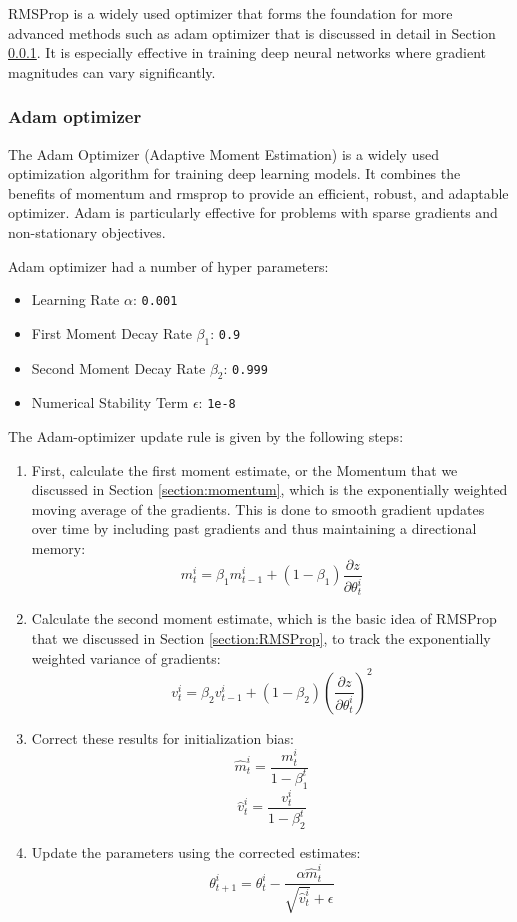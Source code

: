 		
		RMSProp is a widely used optimizer that forms the foundation for more advanced methods such as adam optimizer that is discussed in detail in Section \ref{section:adam}. It is especially effective in training deep neural networks where gradient magnitudes can vary significantly.

	
		\bigskip
		\subsubsection{Adam optimizer}
		\label{section:adam}
		
		The Adam Optimizer (Adaptive Moment Estimation) is a widely used optimization algorithm for training deep learning models. It combines the benefits of momentum and rmsprop to provide an efficient, robust, and adaptable optimizer. Adam is particularly effective for problems with sparse gradients and non-stationary objectives.
		
		
		Adam optimizer had a number of hyper parameters:
		
		\begin{itemize}
			\item Learning Rate $\alpha$: \texttt{0.001}
			\item First Moment Decay Rate $\beta_1$: \texttt{0.9}
			\item Second Moment Decay Rate $\beta_2$: \texttt{0.999}
			\item Numerical Stability Term $\epsilon$: \texttt{1e-8}
		\end{itemize}
		\bigskip

		
		The Adam-optimizer update rule is given by the following steps:
		\bigskip
		\begin{enumerate}
			\item First, calculate the first moment estimate, or the Momentum that we discussed in Section \ref{section:momentum}, which is the exponentially weighted moving average of the gradients. This is done to smooth gradient updates over time by including past gradients and thus maintaining a directional memory:
			$$
			m^i_t = \beta_1 m^i_{t-1} + (1 - \beta_1)\frac{\partial z}{\partial \theta^i_{t}}
			$$
			
			\item Calculate the second moment estimate, which is the basic idea of RMSProp that we discussed in Section \ref{section:RMSProp}, to track the exponentially weighted variance of gradients:
			$$
			v^i_t = \beta_2 v^i_{t-1} + (1 - \beta_2) \left( \frac{\partial z}{\partial \theta^i_{t}} \right)^2
			$$
			
			\item Correct these results for initialization bias:
			$$
			\hat{m}^i_t = \frac{m^i_t}{1 - \beta_1^t}
			$$
			$$
			\hat{v}^i_t = \frac{v^i_t}{1 - \beta_2^t}
			$$
			
			\item Update the parameters using the corrected estimates:
			$$
			\theta^i_{t+1} = \theta^i_t - \frac{\alpha \hat{m}^i_t}{\sqrt{\hat{v}^i_t} + \epsilon}
			$$
		\end{enumerate}


